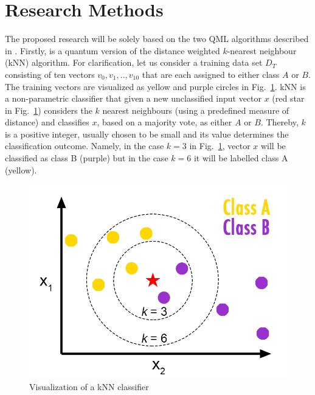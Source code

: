 \documentclass[a4paper]{article}
\newcommand*{\0}{$\ket{0}$}
\newcommand*{\1}{$\ket{1}$}
\begin{document}
\newpage
		
\section{Research Methods}
\label{sec:researchmethods}

The proposed research will be solely based on the two QML algorithms described in \cite{Schuld2014, Schuld2016}. Firstly, \cite{Schuld2014} is a quantum version of the distance weighted $k$-nearest neighbour (kNN) algorithm. For clarification, let us consider a training data set ${D}_{T}$ consisting of ten vectors ${v}_{0}, {v}_{1},..,{v}_{10}$ that are each assigned to either class $A$ or $B$. The training vectors are visualized as yellow and purple circles in Fig.~\ref{fig:knnconcept}. kNN is a non-parametric classifier that given a new unclassified input vector $x$ (red star in Fig.~\ref{fig:knnconcept}) considers the $k$ nearest neighbours (using a predefined measure of distance) and classifies $x$, based on a majority vote, as either $A$ or $B$. Thereby, $k$ is a positive integer, usually chosen to be small and its value determines the classification outcome. Namely, in the case $k = 3$ in Fig.~\ref{fig:knnconcept}, vector $x$ will be classified as class B (purple) but in the case $k = 6$ it will be labelled class A (yellow).

\begin{figure}[!ht]
      \centering
       \includegraphics[scale=0.55]{knn-concept.png}
       \caption[caption for kNN]{\label{fig:knnconcept} Visualization of a kNN classifier\footnotemark[1]}
\end{figure}
\end{document}

